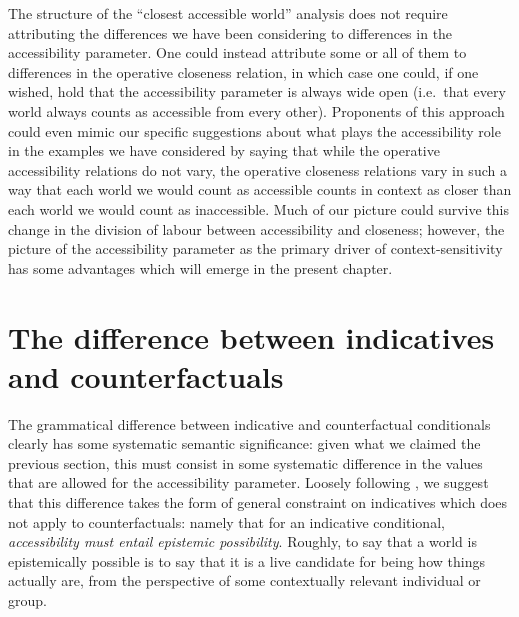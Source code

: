 \documentclass[If.tex]{subfiles}
\begin{document}
The structure of the “closest accessible world” analysis does not require attributing the differences we have been considering to differences in the accessibility parameter.  One could instead attribute some or all of them to differences in the operative closeness relation, in which case one could, if one wished, hold that the accessibility parameter is always wide open (i.e.\ that every world always counts as accessible from every other).  Proponents of this approach could even mimic our specific suggestions about what plays the accessibility role in the examples we have considered by saying that while the operative accessibility relations do not vary, the operative closeness relations vary in such a way that each world we would count as accessible counts in context as closer than each world we would count as inaccessible.  Much of our picture could survive this change in the division of labour between accessibility and closeness; however, the picture of the accessibility parameter as the primary driver of context-sensitivity has some advantages which will emerge in the present chapter.  



\section{The difference between indicatives and counterfactuals} 
\label{sect:indcf}
The grammatical difference between indicative and counterfactual conditionals clearly has some systematic semantic significance: given what we claimed the previous section, this must consist in some systematic difference in the values that are allowed for the accessibility parameter.  Loosely following \citet{vonFintelPSC}, we suggest that this difference takes the form of general constraint on indicatives which does not apply to counterfactuals: namely that for an indicative conditional, \emph{accessibility must entail epistemic possibility}.  Roughly, to say that a world is epistemically possible is to say that it is a live candidate for being how things actually are, from the perspective of some contextually relevant individual or group. 
\end{document}
